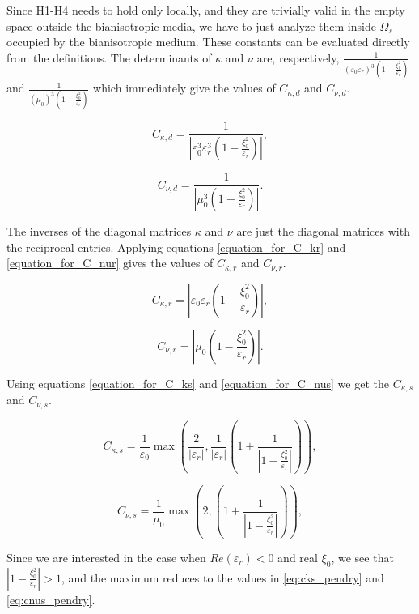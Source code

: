Since H1-H4 needs to hold only locally, and they are trivially 
valid in the empty space outside the bianisotropic media, 
we have to just analyze them inside $\Omega_s$ occupied by the bianisotropic medium.
These constants can be evaluated directly from the definitions. 
The determinants of $\kappa$ and $\nu$ are, respectively, 
$\frac{1}{(\varepsilon_0 \varepsilon_r)^3(1-\frac{\xi_0^2}{\varepsilon_r})}$ and
$\frac{1}{(\mu_0)^3(1-\frac{\xi_0^2}{\varepsilon_r})}$  which immediately give the values of  $C_{\kappa,d}$ and $C_{\nu,d}$.

\begin{equation}
C_{\kappa,d} =  \frac{1}{|\varepsilon_0^3\varepsilon_r^3(1 - \frac{\xi_0^2}{\varepsilon_r})|}, 
\end{equation}

\begin{equation}
C_{\nu,d} =  \frac{1}{|\mu_0^3(1 - \frac{\xi_0^2}{\varepsilon_r})|}.
\end{equation}

The inverses of the diagonal matrices $\kappa$ and $\nu$ are just the 
diagonal matrices with the reciprocal entries.
Applying equations \eqref{equation_for_C_kr} and \eqref{equation_for_C_nur} gives the values of $C_{\kappa,r}$ and $C_{\nu,r}$.

\begin{equation}
C_{\kappa,r} =  |\varepsilon_0\varepsilon_r (1 - \frac{\xi_0^2}{\varepsilon_r})|,
\end{equation}

\begin{equation}
C_{\nu,r} =  |\mu_0 (1 - \frac{\xi_0^2}{\varepsilon_r})|. 
\end{equation}

Using equations \eqref{equation_for_C_ks} and \eqref{equation_for_C_nus} we get the $C_{\kappa,s}$ and $C_{\nu,s}$.

\begin{equation}
C_{\kappa,s} =  \frac{1}{\varepsilon_0} \max(\frac{2}{|\varepsilon_r|}, \frac{1}{|\varepsilon_r|}(1 + \frac{1}{|1 - \frac{\xi_0^2}{\varepsilon_r}|})),
\end{equation}

\begin{equation}
C_{\nu,s} = \frac{1}{\mu_0} \max(2, (1 + \frac{1}{|1 - \frac{\xi_0^2}{\varepsilon_r}|})),
\end{equation}

Since we are interested in the case when $Re(\varepsilon_r) < 0$ and real $\xi_0$, 
 we see that $|1 - \frac{\xi_0^2}{\varepsilon_r}| > 1$,   and the maximum reduces to 
the values in \eqref{eq:cks_pendry} and \eqref{eq:cnus_pendry}.


